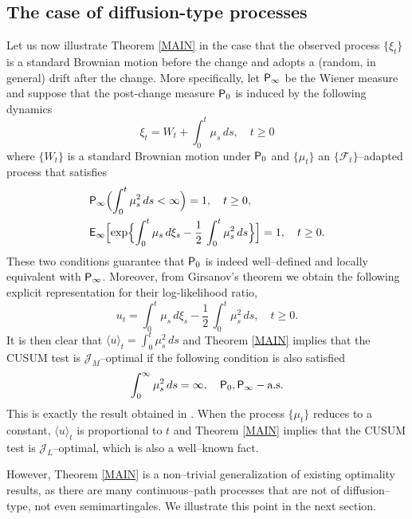 \documentclass[11pt,reqno]{amsart}
\theoremstyle{remark}
\begin{document}
\subsection{The case of diffusion-type processes} \label{dt}
Let us now illustrate Theorem \ref{MAIN} in the case that the observed process $\{\xi_{t}\}$ is a standard Brownian motion  before the change and adopts a (random, in general) drift after the change. More specifically, let ${{\sf P}}_{\infty}$ be the Wiener measure and suppose that the  post-change measure ${{\sf P}}_{0}$ is induced by the following dynamics 
\begin{equation*} 
\xi_{t}= W_{t}+ \int_{0}^{t} \mu_{s} \, ds, \quad t \geq 0
\end{equation*}
where $\{W_{t}\}$ is a standard Brownian motion under ${{\sf P}}_{0}$ and $\{\mu_t\}$ an $\{{\mathcal{F}_{t}}\}$--adapted process
that satisfies 
\begin{align}  
& {{\sf P}}_{\infty} \Bigl( \int_{0}^{t}  \mu_{s}^{2} \, ds < \infty  \Bigr)=1,  \quad t \geq 0 , \label{con1}\\
&  {{\sf E}}_{\infty} \Bigl[ \exp \Bigl\{ \int_{0}^{t}  \mu_{s} \,  d\xi_{s} - \frac{1}{2} \, \int_{0}^{t} \mu_{s}^{2} \, ds \Bigr\} \Bigr] =1, \quad t \geq 0. \label{con2}
\end{align}
These two conditions  guarantee that ${{\sf P}}_{0}$ is indeed well--defined and locally equivalent with ${{\sf P}}_{\infty}$. Moreover, from Girsanov's theorem we obtain the following explicit representation for their log-likelihood ratio, 
\begin{equation*} 
u_{t}= \int_{0}^{t}  \mu_{s} \,  d\xi_{s} - \frac{1}{2} \, \int_{0}^{t} \mu_{s}^{2} \, ds , \quad t \geq 0.
\end{equation*}
It is then clear that $\langle u \rangle_{t} =  \int_{0}^{t} \mu_{s}^{2} \, ds$ and Theorem \ref{MAIN} implies that 
the CUSUM test is ${\mathcal{J}}_{M}$--optimal if the following condition is also satisfied
\begin{equation}
\int_{0}^{\infty} \mu_{s}^{2} \, ds  = \infty, \quad {{\sf P}}_{0}, {{\sf P}}_{\infty}-\text{a.s.}  \label{fullito}
\end{equation}
This is exactly the result obtained in \cite{moustito}. When the process $\{\mu_{t}\}$ reduces to a constant, $\langle u \rangle_{t}$ is proportional to $t$
and Theorem \ref{MAIN} implies that the CUSUM test is ${\mathcal{J}}_L$--optimal, which is also a well--known fact. 
 

However,  Theorem \ref{MAIN} is a non--trivial generalization of existing optimality results, as there are many continuous--path processes that are not of diffusion--type, not even semimartingales. We  illustrate this point in the next section.
\end{document}
